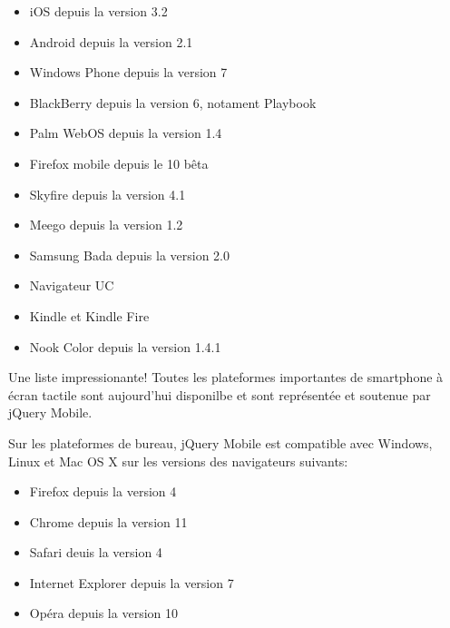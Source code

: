\begin{itemize}
  \item[\textbullet]
  iOS depuis la version 3.2
  
  \item[\textbullet]
  Android depuis la version 2.1
  
  \item[\textbullet]
  Windows Phone depuis la version 7
  
  \item[\textbullet]
  BlackBerry depuis la version 6, notament Playbook
  
  \item[\textbullet]
  Palm WebOS depuis la version 1.4
  
  \item[\textbullet]
  Firefox mobile depuis le 10 bêta
  
  \item[\textbullet]
  Skyfire depuis la version 4.1
  
  \item[\textbullet]
  Meego depuis la version 1.2
  
  \item[\textbullet]
  Samsung Bada depuis la version 2.0
  
  \item[\textbullet]
  Navigateur UC 
  
  \item[\textbullet]
  Kindle et Kindle Fire

  \item[\textbullet]
  Nook Color depuis la version 1.4.1

\end{itemize}

Une liste impressionante! Toutes les plateformes importantes de smartphone à écran tactile sont aujourd’hui disponilbe et sont représentée et soutenue par jQuery Mobile.

Sur les plateformes de bureau, jQuery Mobile est compatible avec Windows, Linux et Mac OS X sur les versions des navigateurs suivants:

\begin{itemize}
  \item[\textbullet]
  Firefox depuis la version 4
  
  \item[\textbullet]
  Chrome depuis la version 11
  
  \item[\textbullet]
  Safari deuis la version 4
  
  \item[\textbullet]
  Internet Explorer depuis la version 7
  
  \item[\textbullet]
  Opéra depuis la version 10

\end{itemize}


